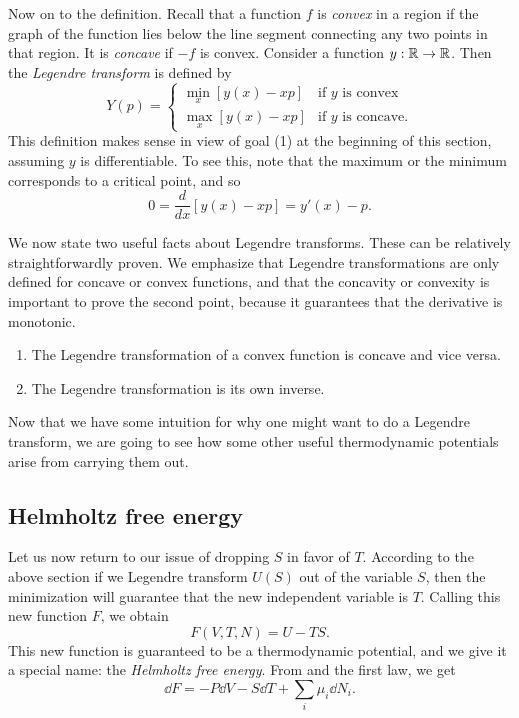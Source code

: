 Now on to the definition. Recall that a function $f$ is {\it convex}
 in a region if the graph of the function lies 
below the line segment connecting any two points in that region. It is 
{\it concave} if $-f$ is convex. Consider
a function $y:\mathbb{R}\to\mathbb{R}$. Then the 
{\it Legendre transform} is defined by
\begin{equation}
Y(p)=\begin{cases}
  \min_x [y(x)-xp] & \text{if $y$ is convex}\\
  \max_x [y(x)-xp] & \text{if $y$ is concave.}
\end{cases}
\end{equation}
This definition makes sense in view of goal (1) at the beginning of this
section, assuming $y$ is differentiable. To see this, note that the maximum
or the minimum corresponds to a critical point, and so
\begin{equation}\label{eq:legendremin}
  0=\frac{d}{dx}\left[y(x)-xp\right]=y'(x)-p.
\end{equation}

We now state two useful facts about Legendre transforms. These can
be relatively straightforwardly proven. We emphasize that Legendre
transformations are only defined for concave or convex functions, and
that the concavity or convexity is important to prove the second point,
because it guarantees that the derivative is monotonic.
\begin{proposition}{}{}
  \begin{enumerate}
    \item The Legendre transformation of a convex function is concave
          and vice versa.
    \item The Legendre transformation is its own inverse.
  \end{enumerate}
\end{proposition}

Now that we have some intuition for why one might want to do a
Legendre transform, we are going to see how some other useful
thermodynamic potentials arise from carrying them out.

\subsection{Helmholtz free energy}
Let us now return to our issue of dropping $S$ in favor
of $T$. According to the above section if we
Legendre transform $U(S)$ out of the variable $S$, then the minimization
will guarantee that the new independent variable is $T$. Calling
this new function $F$, we obtain
\begin{equation}\label{eq:helmholtz}
  F(V,T,N)=U-TS.
\end{equation}
This new function is guaranteed to be a thermodynamic potential, and
we give it a special name: the {\it Helmholtz free energy}.
From  and the first law, we get
\begin{equation}\label{eq:helmholtz1st}
  \dd F = -P\dd V -S\dd T +\sum_i\mu_i\dd{N}_i.
\end{equation}

